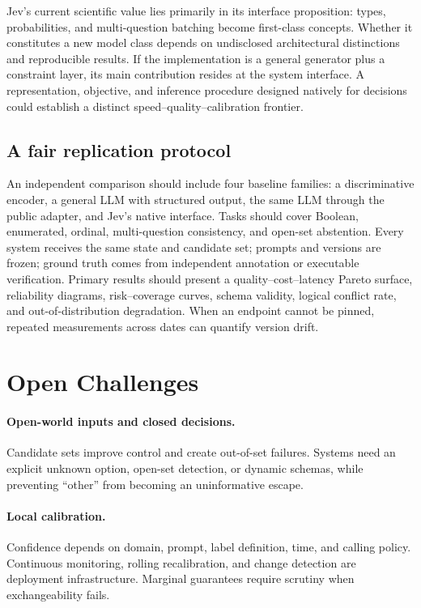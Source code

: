 \documentclass[11pt]{article}
\begin{document}
Jev's current scientific value lies primarily in its interface proposition: types, probabilities, and multi-question batching become first-class concepts. Whether it constitutes a new model class depends on undisclosed architectural distinctions and reproducible results. If the implementation is a general generator plus a constraint layer, its main contribution resides at the system interface. A representation, objective, and inference procedure designed natively for decisions could establish a distinct speed--quality--calibration frontier.

\subsection{A fair replication protocol}

An independent comparison should include four baseline families: a discriminative encoder, a general LLM with structured output, the same LLM through the public adapter, and Jev's native interface. Tasks should cover Boolean, enumerated, ordinal, multi-question consistency, and open-set abstention. Every system receives the same state and candidate set; prompts and versions are frozen; ground truth comes from independent annotation or executable verification. Primary results should present a quality--cost--latency Pareto surface, reliability diagrams, risk--coverage curves, schema validity, logical conflict rate, and out-of-distribution degradation. When an endpoint cannot be pinned, repeated measurements across dates can quantify version drift.

\section{Open Challenges}

\paragraph{Open-world inputs and closed decisions.} Candidate sets improve control and create out-of-set failures. Systems need an explicit unknown option, open-set detection, or dynamic schemas, while preventing ``other'' from becoming an uninformative escape.

\paragraph{Local calibration.} Confidence depends on domain, prompt, label definition, time, and calling policy. Continuous monitoring, rolling recalibration, and change detection are deployment infrastructure. Marginal guarantees require scrutiny when exchangeability fails.
\end{document}

